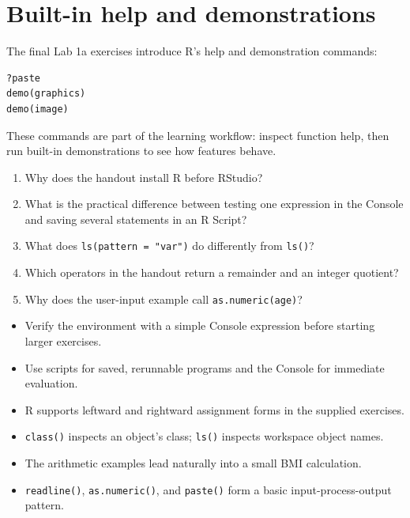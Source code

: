 \section{Built-in help and demonstrations}

The final Lab 1a exercises introduce R's help and demonstration commands:

\begin{lstlisting}[style=dsr]
?paste
demo(graphics)
demo(image)
\end{lstlisting}

These commands are part of the learning workflow: inspect function help, then run built-in demonstrations to see how features behave.

\begin{quickcheck}
\begin{enumerate}
  \item Why does the handout install R before RStudio?
  \item What is the practical difference between testing one expression in the Console and saving several statements in an R Script?
  \item What does \texttt{ls(pattern = "var")} do differently from \texttt{ls()}?
  \item Which operators in the handout return a remainder and an integer quotient?
  \item Why does the user-input example call \texttt{as.numeric(age)}?
\end{enumerate}
\end{quickcheck}

\begin{chapterrecap}
\begin{itemize}
  \item Verify the environment with a simple Console expression before starting larger exercises.
  \item Use scripts for saved, rerunnable programs and the Console for immediate evaluation.
  \item R supports leftward and rightward assignment forms in the supplied exercises.
  \item \texttt{class()} inspects an object's class; \texttt{ls()} inspects workspace object names.
  \item The arithmetic examples lead naturally into a small BMI calculation.
  \item \texttt{readline()}, \texttt{as.numeric()}, and \texttt{paste()} form a basic input-process-output pattern.
\end{itemize}
\end{chapterrecap}
